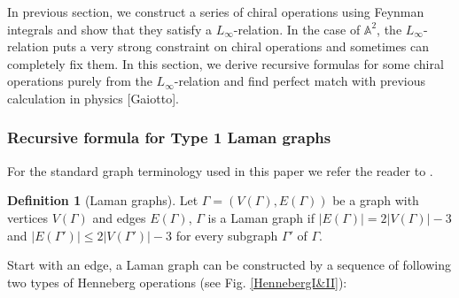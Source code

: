 \documentclass[11pt]{amsart}
\theoremstyle{definition}
\newtheorem{defn}[thm]{Definition}
\theoremstyle{remark}
\numberwithin{equation}{section}
\begin{document}
In previous section, we construct a series of chiral operations using Feynman integrals and show that they satisfy a $L_{\infty}$-relation. In the case of $\mathbb{A}^2$, the $L_{\infty}$-relation puts a very strong constraint on chiral operations and sometimes can completely fix them. In this section, we derive recursive formulas for some chiral operations purely from the $L_{\infty}$-relation and find perfect match with previous calculation in physics [Gaiotto].
\subsubsection{Recursive formula for Type 1 Laman graphs}
For the standard graph terminology used in this paper we refer the reader to \cite{graver1993combinatorial}.
\begin{defn}[Laman graphs]
Let $\Gamma=\left(V(\Gamma),E(\Gamma)\right)$ be a graph with vertices $V(\Gamma)$ and edges $E(\Gamma)$, $\Gamma$ is a Laman graph if $|E(\Gamma)|=2|V(\Gamma)|-3$ and $|E(\Gamma')|\leq 2|V(\Gamma')|-3$ for every subgraph $\Gamma'$ of $\Gamma$.
\end{defn}

Start with an edge, a Laman graph can be constructed by a sequence of following two types of  Henneberg operations (see Fig. \ref{HennebergI&II}):
\end{document}
